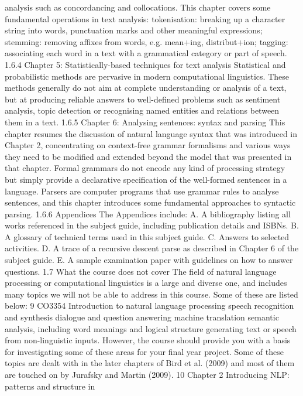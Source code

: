 analysis such as concordancing and collocations. This chapter covers some
fundamental operations in text analysis:
tokenisation: breaking up a character string into words, punctuation marks and
other meaningful expressions;
stemming: removing affixes from words, e.g. mean+ing, distribut+ion;
tagging: associating each word in a text with a grammatical category or part of
speech.
1.6.4 Chapter 5: Statistically-based techniques for text analysis
Statistical and probabilistic methods are pervasive in modern computational
linguistics. These methods generally do not aim at complete understanding or
analysis of a text, but at producing reliable answers to well-defined problems such as
sentiment analysis, topic detection or recognising named entities and relations
between them in a text.
1.6.5 Chapter 6: Analysing sentences: syntax and parsing
This chapter resumes the discussion of natural language syntax that was introduced
in Chapter 2, concentrating on context-free grammar formalisms and various ways
they need to be modified and extended beyond the model that was presented in that
chapter. Formal grammars do not encode any kind of processing strategy but simply
provide a declarative specification of the well-formed sentences in a language.
Parsers are computer programs that use grammar rules to analyse sentences, and
this chapter introduces some fundamental approaches to syntactic parsing.
1.6.6 Appendices
The Appendices include:
A. A bibliography listing all works referenced in the subject guide, including
publication details and ISBNs.
B. A glossary of technical terms used in this subject guide.
C. Answers to selected activities.
D. A trace of a recursive descent parse as described in Chapter 6 of the subject guide.
E. A sample examination paper with guidelines on how to answer questions.
1.7 What the course does not cover
The field of natural language processing or computational linguistics is a large and
diverse one, and includes many topics we will not be able to address in this course.
Some of these are listed below:
9
CO3354 Introduction to natural language processing
speech recognition and synthesis
dialogue and question answering
machine translation
semantic analysis, including word meanings and logical structure
generating text or speech from non-linguistic inputs.
However, the course should provide you with a basis for investigating some of these
areas for your final year project. Some of these topics are dealt with in the later
chapters of Bird et al. (2009) and most of them are touched on by Jurafsky and
Martin (2009).
10
Chapter 2
Introducing NLP: patterns and structure in
